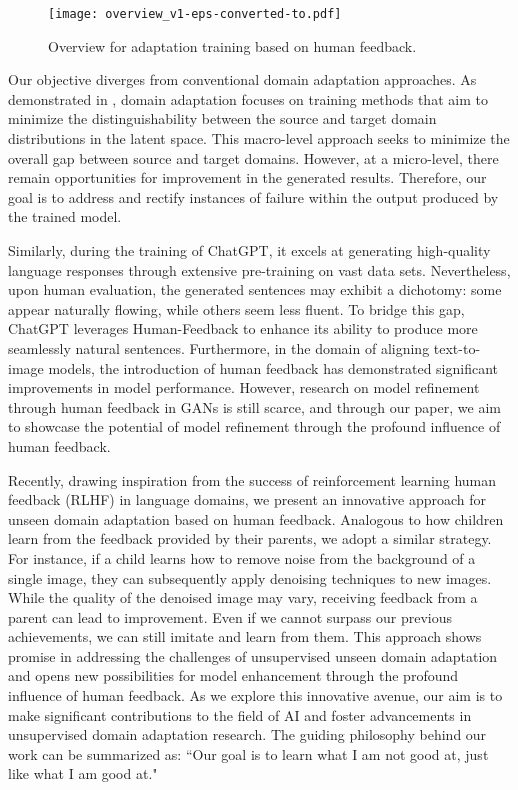 \documentclass[lettersize,journal]{IEEEtran}
\begin{document}
\begin{figure}[!t]
\centering
\texttt{[image: overview\_v1-eps-converted-to.pdf]}
\caption{Overview for adaptation training based on human feedback.}
\label{fig_1}
\end{figure}
\IEEEpubidadjcol
Our objective diverges from conventional domain adaptation approaches. As demonstrated in \cite{volpi2018adversarial,lin2019real}, domain adaptation focuses on training methods that aim to minimize the distinguishability between the source and target domain distributions in the latent space. This macro-level approach seeks to minimize the overall gap between source and target domains. However, at a micro-level, there remain opportunities for improvement in the generated results. Therefore, our goal is to address and rectify instances of failure within the output produced by the trained model.

Similarly, during the training of ChatGPT\cite{brown2020language}, it excels at generating high-quality language responses through extensive pre-training on vast data sets. Nevertheless, upon human evaluation, the generated sentences may exhibit a dichotomy: some appear naturally flowing, while others seem less fluent. To bridge this gap, ChatGPT\cite{brown2020language} leverages Human-Feedback\cite{NIPS2017_hf} to enhance its ability to produce more seamlessly natural sentences. Furthermore, in the domain of aligning text-to-image models\cite{lee2023aligning}, the introduction of human feedback has demonstrated significant improvements in model performance. However, research on model refinement through human feedback in GANs is still scarce, and through our paper, we aim to showcase the potential of model refinement through the profound influence of human feedback.

Recently, drawing inspiration from the success of reinforcement learning human feedback (RLHF) \cite{NEURIPS2020_learning_summary_hf} in language domains, we present an innovative approach for unseen domain adaptation based on human feedback. Analogous to how children learn from the feedback provided by their parents, we adopt a similar strategy. For instance, if a child learns how to remove noise from the background of a single image, they can subsequently apply denoising techniques to new images. While the quality of the denoised image may vary, receiving feedback from a parent can lead to improvement. Even if we cannot surpass our previous achievements, we can still imitate and learn from them. This approach shows promise in addressing the challenges of unsupervised unseen domain adaptation and opens new possibilities for model enhancement through the profound influence of human feedback. As we explore this innovative avenue, our aim is to make significant contributions to the field of AI and foster advancements in unsupervised domain adaptation research. The guiding philosophy behind our work can be summarized as: ``Our goal is to learn what I am not good at, just like what I am good at."
\end{document}
